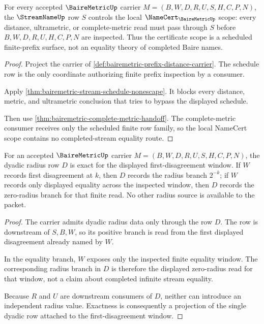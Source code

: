 \begin{theorem}
\label{thm:bairemetric-streamname-namecert-scope}
For every accepted $\BaireMetricUp$ carrier $M=(B,W,D,R,U,S,H,C,P,N)$, the $\StreamNameUp$ row $S$ controls the local $\NameCert_{\BaireMetricUp}$ scope: every distance, ultrametric, or complete-metric read must pass through $S$ before $B,W,D,R,U,H,C,P,N$ are inspected. Thus the certificate scope is a scheduled finite-prefix surface, not an equality theory of completed Baire names.
\end{theorem}
\begin{proof}
Project the carrier of \autoref{def:bairemetric-prefix-distance-carrier}. The schedule row is the only coordinate authorizing finite prefix inspection by a consumer.

Apply \autoref{thm:bairemetric-stream-schedule-nonescape}. It blocks every distance, metric, and ultrametric conclusion that tries to bypass the displayed schedule.

Then use \autoref{thm:bairemetric-complete-metric-handoff}. The complete-metric consumer receives only the scheduled finite row family, so the local NameCert scope contains no completed-stream equality route.
\end{proof}

\begin{theorem}
\label{thm:bairemetric-first-disagreement-dyadic-radius-exactness}
For an accepted $\BaireMetricUp$ carrier $M=(B,W,D,R,U,S,H,C,P,N)$, the dyadic radius row $D$ is exact for the displayed first-disagreement window. If $W$ records first disagreement at $k$, then $D$ records the radius branch $2^{-k}$; if $W$ records only displayed equality across the inspected window, then $D$ records the zero-radius branch for that finite read. No other radius source is available to the packet.
\end{theorem}
\begin{proof}
The carrier admits dyadic radius data only through the row $D$. The row is downstream of $S,B,W$, so its positive branch is read from the first displayed disagreement already named by $W$.

In the equality branch, $W$ exposes only the inspected finite equality window. The corresponding radius branch in $D$ is therefore the displayed zero-radius read for that window, not a claim about completed infinite stream equality.

Because $R$ and $U$ are downstream consumers of $D$, neither can introduce an independent radius value. Exactness is consequently a projection of the single dyadic row attached to the first-disagreement window.
\end{proof}

